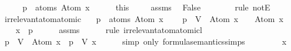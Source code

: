 \begin{isabellebody}
\ \ \isamarkupfalse%
\ \isamarkupfalse%
\ {\isachardoublequoteopen}p\ {\isasymin}\ atoms\ {\isacharparenleft}Atom\ x{\isacharparenright}{\isachardoublequoteclose}\isanewline
\ \ \ \ \isamarkupfalse%
\ this\ \isanewline
\ \ \isamarkupfalse%
\ assms\ \isamarkupfalse%
\ {\isachardoublequoteopen}False{\isachardoublequoteclose}\ \ \isanewline
\ \ \ \ \isamarkupfalse%
\ {\isacharparenleft}rule\ notE{\isacharparenright}\isanewline
{}\isamarkupfalse%
%
\endisatagproof
{\isafoldproof}%
%
\isadelimproof
\isanewline
%
\endisadelimproof
\isanewline
{}\isamarkupfalse%
\ irrelevant{\isacharunderscore}atom{\isacharunderscore}atomic{\isacharcolon}\isanewline
\ \ \ {\isachardoublequoteopen}p\ {\isasymnotin}\ atoms\ {\isacharparenleft}Atom\ x{\isacharparenright}{\isachardoublequoteclose}\ \isanewline
\ \ \ {\isachardoublequoteopen}{\isacharparenleft}{\isasymA}{\isacharparenleft}p\ {\isacharcolon}{\isacharequal}\ V{\isacharparenright}{\isacharparenright}\ {\isasymTurnstile}\ {\isacharparenleft}Atom\ x{\isacharparenright}\ {\isasymlongleftrightarrow}\ {\isasymA}\ {\isasymTurnstile}\ {\isacharparenleft}Atom\ x{\isacharparenright}{\isachardoublequoteclose}\isanewline
%
\isadelimproof
%
\endisadelimproof
%
\isatagproof
{}\isamarkupfalse%
\ {\isacharminus}\isanewline
\ \ \isamarkupfalse%
\ {\isachardoublequoteopen}x\ {\isasymnoteq}\ p{\isachardoublequoteclose}\isanewline
\ \ \ \ \isamarkupfalse%
\ assms\isanewline
\ \ \ \ \isamarkupfalse%
\ {\isacharparenleft}rule\ irrelevant{\isacharunderscore}atom{\isacharunderscore}atomic{\isacharunderscore}l{}{\isacharparenright}\isanewline
\ \ \isamarkupfalse%
\ {\isachardoublequoteopen}{\isacharparenleft}{\isasymA}{\isacharparenleft}p\ {\isacharcolon}{\isacharequal}\ V{\isacharparenright}{\isacharparenright}\ {\isasymTurnstile}\ {\isacharparenleft}Atom\ x{\isacharparenright}\ {\isacharequal}\ {\isacharparenleft}{\isasymA}{\isacharparenleft}p\ {\isacharcolon}{\isacharequal}\ V{\isacharparenright}{\isacharparenright}\ x{\isachardoublequoteclose}\isanewline
\ \ \ \ \isamarkupfalse%
\ {\isacharparenleft}simp\ only{\isacharcolon}\ formula{\isacharunderscore}semantics{\isachardot}simps{\isacharparenleft}{}{\isacharparenright}{\isacharparenright}\isanewline
\ \ \isamarkupfalse%
\ \isamarkupfalse%
\ {\isachardoublequoteopen}{\isasymdots}\ {\isacharequal}\ {\isasymA}\ x{\isachardoublequoteclose}\isanewline

\end{isabellebody}

